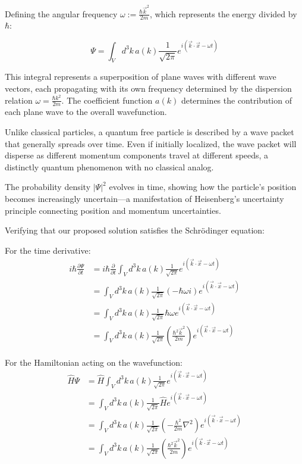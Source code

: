 \documentclass[italian]{HKNdocument}
\begin{document}
Defining the angular frequency $\omega := \frac{\hbar\vec{k}^2}{2m}$, which represents the energy divided by $\hbar$:

\begin{equation}
\Psi = \int_V d^3k\,a(k)\frac{1}{\sqrt{2\pi}}e^{i(\vec{k}\cdot\vec{x} - \omega t)} \label{eq:3.6}
\end{equation}

This integral represents a superposition of plane waves with different wave vectors, each propagating with its own frequency determined by the dispersion relation $\omega = \frac{\hbar k^2}{2m}$. The coefficient function $a(k)$ determines the contribution of each plane wave to the overall wavefunction.

Unlike classical particles, a quantum free particle is described by a wave packet that generally spreads over time. Even if initially localized, the wave packet will disperse as different momentum components travel at different speeds, a distinctly quantum phenomenon with no classical analog.

The probability density $|\Psi|^2$ evolves in time, showing how the particle's position becomes increasingly uncertain—a manifestation of Heisenberg's uncertainty principle connecting position and momentum uncertainties.


Verifying that our proposed solution satisfies the Schrödinger equation:

For the time derivative:
\begin{align}
i\hbar\frac{\partial\Psi}{\partial t} &= i\hbar\frac{\partial}{\partial t}\int_V d^3k\,a(k)\frac{1}{\sqrt{2\pi}}e^{i(\vec{k}\cdot\vec{x}-\omega t)} \\
&= \int_V d^3k\,a(k)\frac{1}{\sqrt{2\pi}}(-\hbar\omega i)e^{i(\vec{k}\cdot\vec{x}-\omega t)} \\
&= \int_V d^3k\,a(k)\frac{1}{\sqrt{2\pi}}\hbar\omega e^{i(\vec{k}\cdot\vec{x}-\omega t)} \label{eq:3.7} \\
&= \int_V d^3k\,a(k)\frac{1}{\sqrt{2\pi}}\left(\frac{\hbar^2\vec{k}^2}{2m}\right)e^{i(\vec{k}\cdot\vec{x}-\omega t)}
\end{align}

For the Hamiltonian acting on the wavefunction:
\begin{align}
\hat{H}\Psi &= \hat{H}\int_V d^3k\,a(k)\frac{1}{\sqrt{2\pi}}e^{i(\vec{k}\cdot\vec{x}-\omega t)} \\
&= \int_V d^3k\,a(k)\frac{1}{\sqrt{2\pi}}\hat{H}e^{i(\vec{k}\cdot\vec{x}-\omega t)} \\
&= \int_V d^3k\,a(k)\frac{1}{\sqrt{2\pi}}\left(-\frac{\hbar^2}{2m}\nabla^2\right)e^{i(\vec{k}\cdot\vec{x}-\omega t)} \label{eq:3.8} \\
&= \int_V d^3k\,a(k)\frac{1}{\sqrt{2\pi}}\left(\frac{\hbar^2\vec{k}^2}{2m}\right)e^{i(\vec{k}\cdot\vec{x}-\omega t)}
\end{align}
\end{document}
